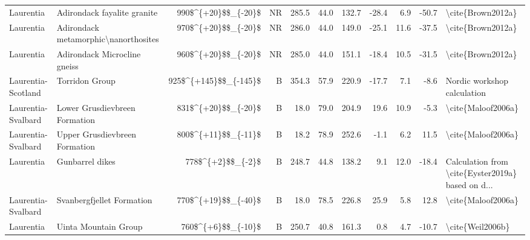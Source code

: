 \begin{longtable}{p{1 in}p{1 in}rrrrrrrr}
                     Laurentia &                      Adirondack fayalite granite &    990\$\textasciicircum \{+20\}\$\$\_\{-20\}\$ &     NR &     285.5 &      44.0 & 132.7 & -28.4 &       6.9 &       -50.7 &                                  \textbackslash cite\{Brown2012a\} \\
                     Laurentia &             Adirondack metamorphic\textbackslash nanorthosites &    970\$\textasciicircum \{+20\}\$\$\_\{-20\}\$ &     NR &     286.0 &      44.0 & 149.0 & -25.1 &      11.6 &       -37.5 &                                  \textbackslash cite\{Brown2012a\} \\
                     Laurentia &                     Adirondack Microcline gneiss &    960\$\textasciicircum \{+20\}\$\$\_\{-20\}\$ &     NR &     285.0 &      44.0 & 151.1 & -18.4 &      10.5 &       -31.5 &                                  \textbackslash cite\{Brown2012a\} \\
            Laurentia-Scotland &                                   Torridon Group &  925\$\textasciicircum \{+145\}\$\$\_\{-145\}\$ &      B &     354.3 &      57.9 & 220.9 & -17.7 &       7.1 &        -8.6 &                        Nordic workshop calculation \\
            Laurentia-Svalbard &                    Lower Grusdievbreen Formation &    831\$\textasciicircum \{+20\}\$\$\_\{-20\}\$ &      B &      18.0 &      79.0 & 204.9 &  19.6 &      10.9 &        -5.3 &                                 \textbackslash cite\{Maloof2006a\} \\
            Laurentia-Svalbard &                    Upper Grusdievbreen Formation &    800\$\textasciicircum \{+11\}\$\$\_\{-11\}\$ &      B &      18.2 &      78.9 & 252.6 &  -1.1 &       6.2 &        11.5 &                                 \textbackslash cite\{Maloof2006a\} \\
                     Laurentia &                                  Gunbarrel dikes &      778\$\textasciicircum \{+2\}\$\$\_\{-2\}\$ &      B &     248.7 &      44.8 & 138.2 &   9.1 &      12.0 &       -18.4 &  Calculation from \textbackslash cite\{Eyster2019a\} based on d... \\
            Laurentia-Svalbard &                        Svanbergfjellet Formation &    770\$\textasciicircum \{+19\}\$\$\_\{-40\}\$ &      B &      18.0 &      78.5 & 226.8 &  25.9 &       5.8 &        12.8 &                                 \textbackslash cite\{Maloof2006a\} \\
                     Laurentia &                             Uinta Mountain Group &     760\$\textasciicircum \{+6\}\$\$\_\{-10\}\$ &      B &     250.7 &      40.8 & 161.3 &   0.8 &       4.7 &       -10.7 &                                   \textbackslash cite\{Weil2006b\} \\

\end{longtable}
